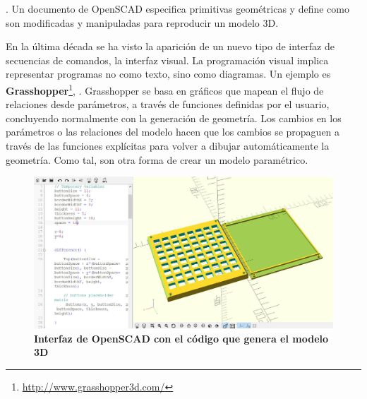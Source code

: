  \citep{Kintel}.
Un documento de OpenSCAD especifica primitivas geométricas y define como son modificadas y manipuladas para reproducir un modelo 3D.

En la última década se ha visto la aparición de un nuevo tipo de interfaz de secuencias de comandos, la interfaz visual. La programación visual implica representar programas no como texto, sino como diagramas. Un ejemplo es \textbf{Grasshopper}\footnote{ \url{http://www.grasshopper3d.com/}},  \citep{BobMcNeel}. Grasshopper se basa en gráficos que mapean el flujo de relaciones desde parámetros, a través de funciones definidas por el usuario, concluyendo normalmente con la generación de geometría. Los cambios en los parámetros o las relaciones del modelo hacen que los cambios se propaguen a través de las funciones explícitas para volver a dibujar automáticamente la geometría. Como tal, son otra forma de crear un modelo paramétrico.


\begin{figure}[h]
\includegraphics[width=14cm]{Img/CPD/openscadc.jpg}
\centering
\caption{\textbf{\footnotesize{Interfaz de OpenSCAD con el código que genera el modelo 3D}}}
\end{figure}

